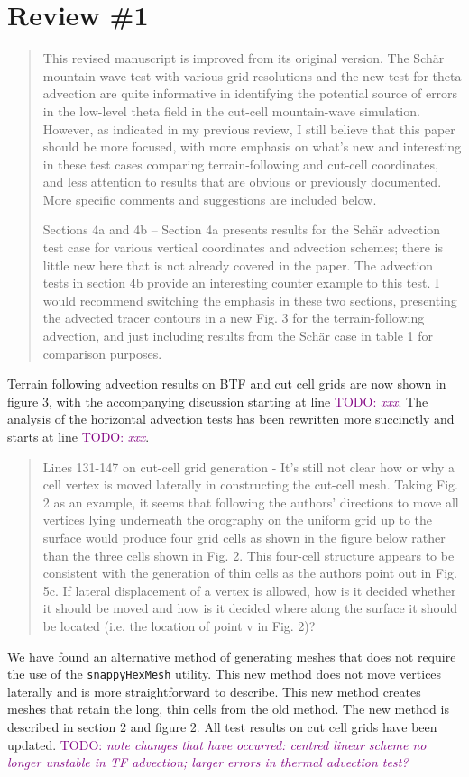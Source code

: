 \documentclass{article}
\newcommand{\TODO}[1]{\textcolor{purple}{TODO: \emph{#1}}}
\begin{document}
\section*{Review \#1}
\begin{quotation}
This revised manuscript is improved from its original version. The Sch\"{a}r mountain wave test with various grid resolutions and the new test for theta advection are quite informative in identifying the potential source of errors in the low-level theta field in the cut-cell mountain-wave simulation. However, as indicated in my previous review, I still believe that this paper should be more focused, with more emphasis on what's new and interesting in these test cases comparing terrain-following and cut-cell coordinates, and less attention to results that are obvious or previously documented. More specific comments and suggestions are included below. 

Sections 4a and 4b -- Section 4a presents results for the Sch\"{a}r advection test case for various vertical coordinates and advection schemes; there is little new here that is not already covered in the \citet{schaer2002} paper. The advection tests in section 4b provide an interesting counter example to this test. I would recommend switching the emphasis in these two sections, presenting the advected tracer contours in a new Fig. 3 for the terrain-following advection, and just including results from the Sch\"{a}r case in table 1 for comparison purposes.
\end{quotation}
Terrain following advection results on BTF and cut cell grids are now shown in figure 3, with the accompanying discussion starting at line \TODO{xxx}.  The analysis of the horizontal advection tests has been rewritten more succinctly and starts at line \TODO{xxx}.

\begin{quotation}
 Lines 131-147 on cut-cell grid generation - It's still not clear how or why a cell vertex  is moved laterally in constructing the cut-cell mesh. Taking Fig. 2 as an example, it  seems that following the authors' directions to move all vertices lying underneath the  orography on the uniform grid up to the surface would produce four grid cells as  shown in the figure below rather than the three cells shown in Fig. 2. This four-cell structure appears to be consistent with the generation of thin cells as the authors  point out in Fig. 5c. If lateral displacement of a vertex is allowed, how is it decided  whether it should be moved and how is it decided where along the surface it should  be located (i.e. the location of point v in Fig. 2)?
\end{quotation}
We have found an alternative method of generating meshes that does not require the use of the \texttt{snappyHexMesh} utility.  This new method does not move vertices laterally and is more straightforward to describe.  This new method creates meshes that retain the long, thin cells from the old method.  The new method is described in section 2 and figure 2.  All test results on cut cell grids have been updated.  \TODO{note changes that have occurred: centred linear scheme no longer unstable in TF advection; larger errors in thermal advection test?}
\end{document}
